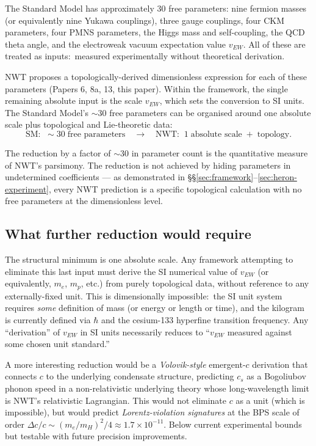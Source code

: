 \documentclass[11pt]{article}
\begin{document}
The Standard Model has approximately 30 free parameters: nine
fermion masses (or equivalently nine Yukawa couplings), three
gauge couplings, four CKM parameters, four PMNS parameters, the
Higgs mass and self-coupling, the QCD theta angle, and the
electroweak vacuum expectation value $v_{EW}$.  All of these are
treated as inputs:\ measured experimentally without theoretical
derivation.

NWT proposes a topologically-derived dimensionless expression for
each of these parameters (Papers 6, 8a, 13, this paper).  Within the
framework, the single remaining absolute input is the scale $v_{EW}$,
which sets the conversion to SI units.  The Standard Model's
$\sim 30$ free parameters can be organised around one absolute scale
plus topological and Lie-theoretic data:
\begin{equation}
  \text{SM:}\;\;\sim 30\;\text{free parameters}
  \quad\longrightarrow\quad
  \text{NWT:}\;\;1\;\text{absolute scale}\;+\;\text{topology}.
\end{equation}

The reduction by a factor of $\sim 30$ in parameter count is the
quantitative measure of NWT's parsimony.  The reduction is not
achieved by hiding parameters in undetermined coefficients --- as
demonstrated in \S\S\ref{sec:framework}--\ref{sec:heron-experiment},
every NWT prediction is a specific topological calculation with
no free parameters at the dimensionless level.

\subsection{What further reduction would require}
\label{sec:further-reduction}

The structural minimum is one absolute scale.  Any framework
attempting to eliminate this last input must derive the SI
numerical value of $v_{EW}$ (or equivalently, $m_e$, $m_p$, etc.)
from purely topological data, without reference to any
externally-fixed unit.  This is dimensionally impossible:\ the
SI unit system requires \emph{some} definition of mass (or energy
or length or time), and the kilogram is currently defined via
$\hbar$ and the cesium-133 hyperfine transition frequency.  Any
``derivation'' of $v_{EW}$ in SI units necessarily reduces to
``$v_{EW}$ measured against some chosen unit standard.''

A more interesting reduction would be a \emph{Volovik-style}
emergent-$c$ derivation that connects $c$ to the underlying
condensate structure, predicting $c_s$ as a Bogoliubov phonon
speed in a non-relativistic underlying theory whose long-wavelength
limit is NWT's relativistic Lagrangian.  This would not eliminate
$c$ as a unit (which is impossible), but would predict
\emph{Lorentz-violation signatures} at the BPS scale of order
$\Delta c/c \sim (m_e/m_H)^2/4 \approx 1.7 \times 10^{-11}$.
Below current experimental bounds but testable with future
precision improvements.
\end{document}
